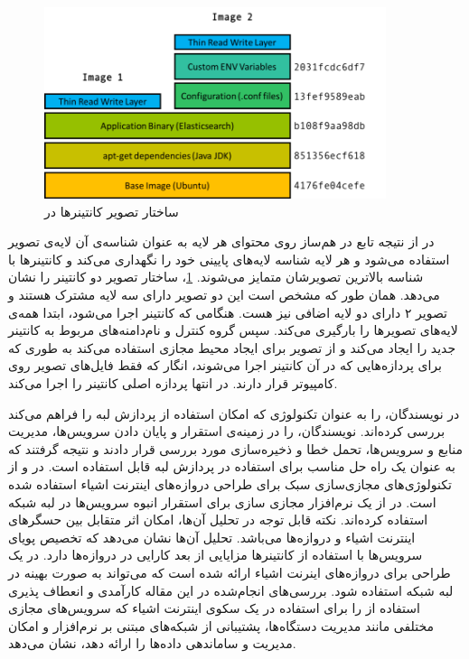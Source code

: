     \begin{figure}[]
      \centerline{\includegraphics[width=10cm]{graphics/chapter_2/docker_image}}
      \caption{ساختار تصویر کانتینر‌ها در  \cite{2019demystifying}}
      \label{fig:chapter_2:docker_image}
    \end{figure}

    در  از نتیجه تابع در هم‌ساز  روی محتوای هر لایه به عنوان شناسه‌ی آن لایه‌ی تصویر استفاده می‌شود و هر لایه شناسه لایه‌های پایینی خود را نگهداری می‌کند و کانتینر‌ها با شناسه بالاترین تصویرشان متمایز می‌شوند.
    \cref{fig:chapter_2:docker_image}، ساختار تصویر دو کانتینر را نشان می‌دهد.
    همان طور که مشخص است این دو تصویر دارای سه لایه مشترک هستند و تصویر ۲ دارای دو لایه اضافی نیز هست.
    هنگامی که کانتینر اجرا می‌شود،  ابتدا همه‌ی لایه‌های تصویر‌ها را بارگیری می‌کند.
    سپس گروه کنترل و نام‌دامنه‌های مربوط به کانتینر جدید را ایجاد می‌کند و از تصویر برای ایجاد محیط مجازی استفاده می‌کند به طوری که برای پردازه‌هایی که در آن کانتینر اجرا می‌شوند، انگار که فقط فایل‌های تصویر روی کامپیوتر قرار دارند.
    در انتها پردازه اصلی کانتینر را اجرا می‌کند.

    در \cite{ismail2015evaluation} نویسندگان،  را به عنوان تکنولوژی که امکان استفاده از پردازش لبه را فراهم می‌کند بررسی کرده‌اند.
    نویسندگان،  را در زمینه‌ی استقرار و پایان دادن سرویس‌ها، مدیریت منابع و سرویس‌ها، تحمل خطا و ذخیره‌سازی مورد بررسی قرار دادند و نتیجه گرفتند که  به عنوان یک راه حل مناسب برای استفاده در پردازش لبه قابل استفاده است.
    در \cite{viswanath2016system} و \cite{morabito2016enabling} از تکنولوژی‌های مجازی‌سازی سبک برای طراحی دروازه‌های اینترنت اشیاء استفاده شده است.
    در \cite{viswanath2016system} از یک نرم‌افزار مجازی سازی برای استقرار انبوه سرویس‌ها در لبه شبکه استفاده کرده‌اند.
    نکته قابل توجه در تحلیل آن‌ها، امکان اثر متقابل بین حسگر‌های اینترنت اشیاء و دروازه‌‌ها می‌باشد.
    تحلیل آن‌ها نشان می‌دهد که تخصیص پویای سرویس‌ها با استفاده از کانتینر‌ها مزایایی از بعد کارایی در دروازه‌ها دارد.
    در \cite{morabito2016enabling} یک طراحی برای دروازه‌های اینرنت اشیاء ارائه شده است که می‌تواند به صورت بهینه در لبه شبکه استفاده شود.
    بررسی‌های انجام‌شده در این مقاله کارآمدی و انعطاف پذیری استفاده از  را برای استفاده در یک سکوی‌ اینترنت اشیاء که سرویس‌های مجازی مختلفی مانند مدیریت دستگاه‌ها، پشتیبانی از شبکه‌های مبتنی بر نرم‌افزار و امکان مدیریت و ساماندهی داده‌ها را ارائه دهد، نشان می‌دهد.

